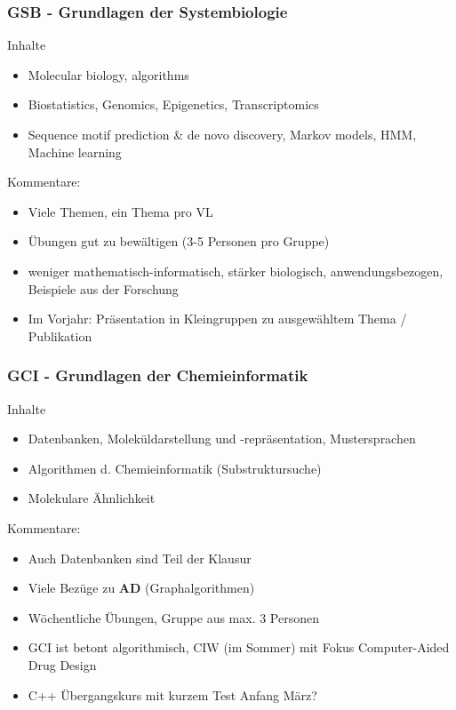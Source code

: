 \begin{frame}
     \frametitle{GSB - Grundlagen der Systembiologie}
  \logos 
    \begin{alertblock}{Inhalte}
  \small
      \begin{itemize}
          \item Molecular biology, algorithms
          \item Biostatistics, Genomics, Epigenetics, Transcriptomics
          \item Sequence motif prediction \& de novo discovery, Markov models, HMM, Machine learning
      \end{itemize}
  \end{alertblock} 
\pause 
Kommentare:
\begin{itemize}
    \item Viele Themen, ein Thema pro VL
    \item Übungen gut zu bewältigen (3-5 Personen pro Gruppe)
    \item weniger mathematisch-informatisch, stärker biologisch, anwendungsbezogen, Beispiele aus der Forschung
    \item Im Vorjahr: Präsentation in Kleingruppen zu ausgewähltem Thema / Publikation
\end{itemize}
\end{frame}


\begin{frame}
     \frametitle{GCI - Grundlagen der Chemieinformatik}
  \logos 

    \begin{alertblock}{Inhalte}
  \small
      \begin{itemize}
          \item Datenbanken, Moleküldarstellung und -repräsentation, Mustersprachen
          \item Algorithmen d. Chemieinformatik (Substruktursuche)
          \item Molekulare Ähnlichkeit
      \end{itemize}
  \end{alertblock}
\pause
Kommentare:
\begin{itemize}
    \item Auch Datenbanken sind Teil der Klausur
    \item Viele Bezüge zu \textbf{AD} (Graphalgorithmen)
    \item Wöchentliche Übungen, Gruppe aus max. 3 Personen
    \item GCI ist betont algorithmisch, CIW (im Sommer) mit Fokus Computer-Aided Drug Design
    \item C++ Übergangskurs mit kurzem Test Anfang März?
\end{itemize}


\end{frame}

